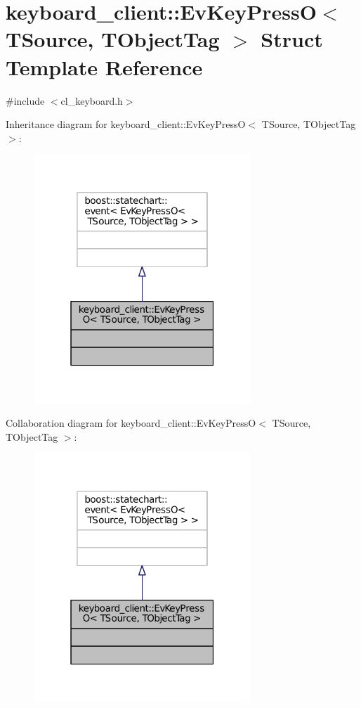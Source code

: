 \hypertarget{structkeyboard__client_1_1EvKeyPressO}{}\section{keyboard\+\_\+client\+:\+:Ev\+Key\+PressO$<$ T\+Source, T\+Object\+Tag $>$ Struct Template Reference}
\label{structkeyboard__client_1_1EvKeyPressO}


{\ttfamily \#include $<$cl\+\_\+keyboard.\+h$>$}



Inheritance diagram for keyboard\+\_\+client\+:\+:Ev\+Key\+PressO$<$ T\+Source, T\+Object\+Tag $>$\+:
\nopagebreak
\begin{figure}[H]
\begin{center}
\leavevmode
\includegraphics[width=232pt]{structkeyboard__client_1_1EvKeyPressO__inherit__graph}
\end{center}
\end{figure}


Collaboration diagram for keyboard\+\_\+client\+:\+:Ev\+Key\+PressO$<$ T\+Source, T\+Object\+Tag $>$\+:
\nopagebreak
\begin{figure}[H]
\begin{center}
\leavevmode
\includegraphics[width=232pt]{structkeyboard__client_1_1EvKeyPressO__coll__graph}
\end{center}
\end{figure}


